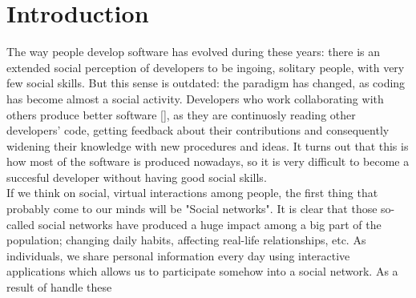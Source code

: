 \documentclass[a4paper, 12pt]{book}
\begin{document}
\tableofcontents
\cleardoublepage
\listoffigures %



\cleardoublepage
\chapter{Introduction}
\label{sec:intro} %
The way people develop software has evolved during these years: there is an extended social perception of developers to
be ingoing, solitary people, with very few social skills. But this sense is outdated: the paradigm has changed,
as coding has become almost a social activity. Developers who work collaborating with others produce better software [], as they
are continuosly reading other developers' code, getting feedback about their contributions and consequently
widening their knowledge with new procedures and ideas. It turns out that this is how most of the software is produced nowadays,
so it is very difficult to become a succesful developer without having good social skills.\\
If we think on social, virtual interactions among people, the first thing that probably come to our minds will be
"Social networks". It is clear that those so-called social networks have produced a huge impact among a big part of the
population; changing daily habits, affecting real-life relationships, etc. As individuals, we share personal information every
day using interactive applications which allows us to participate somehow into a social network. As a result of handle these
\end{document}
